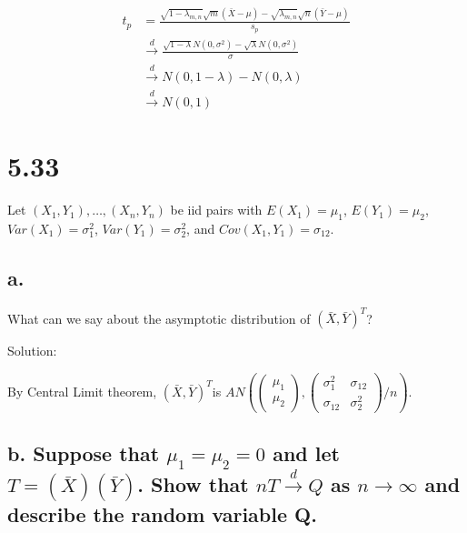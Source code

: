 \documentclass[
  letterpaper,
  DIV=11,
  numbers=noendperiod]{scrreprt}
\begin{document}
\[\begin{aligned}
t_p &= \frac{\sqrt{1-\lambda_{m,n}} \sqrt m(\bar X - \mu)- \sqrt{\lambda_{m,n}}\sqrt n(\bar Y-\mu)}{s_p} \\
& \overset d \to \frac{\sqrt{1-\lambda}N(0,\sigma^2)- \sqrt{\lambda}N(0,\sigma^2)} \sigma \\
& \overset d \to N(0,1-\lambda)-N(0, \lambda) \\
& \overset d \to N(0,1)
\end{aligned}\]

\newpage

\hypertarget{section-33}{%
\section{5.33}\label{section-33}}

Let \((X_1,Y_1),\dots ,(X_n,Y_n)\) be iid pairs with \(E(X_1) = \mu_1\),
\(E(Y_1) =\mu_2\), \(Var(X_1) = \sigma_1^2\), \(Var(Y_1) = \sigma_2^2\),
and \(Cov(X_1, Y_1) = \sigma_{12}\).

\hypertarget{a.-6}{%
\subsection{a.}\label{a.-6}}

What can we say about the asymptotic distribution of
\((\bar X, \bar Y)^T\)?

Solution:

By Central Limit theorem, \((\bar X, \bar Y)^T\)is
\(AN\left( \begin{pmatrix} \mu_1 \\ \mu_2 \end{pmatrix}, \begin{pmatrix} \sigma_1^2 & \sigma_{12} \\ \sigma_{12} & \sigma_2^2 \end{pmatrix} \bigg/n \right)\).

\hypertarget{b.-suppose-that-mu_1mu_20-and-let-t-bar-xbar-y.-show-that-nt-overset-d-to-q-as-n-to-infty-and-describe-the-random-variable-q.}{%
\subsection{\texorpdfstring{b. Suppose that \(\mu_1=\mu_2=0\) and let
\(T = (\bar X)(\bar Y)\). Show that \(nT \overset d \to Q\) as
\(n \to \infty\) and describe the random variable
Q.}{b. Suppose that \textbackslash mu\_1=\textbackslash mu\_2=0 and let T = (\textbackslash bar X)(\textbackslash bar Y). Show that nT \textbackslash overset d \textbackslash to Q as n \textbackslash to \textbackslash infty and describe the random variable Q.}}\label{b.-suppose-that-mu_1mu_20-and-let-t-bar-xbar-y.-show-that-nt-overset-d-to-q-as-n-to-infty-and-describe-the-random-variable-q.}}
\end{document}
